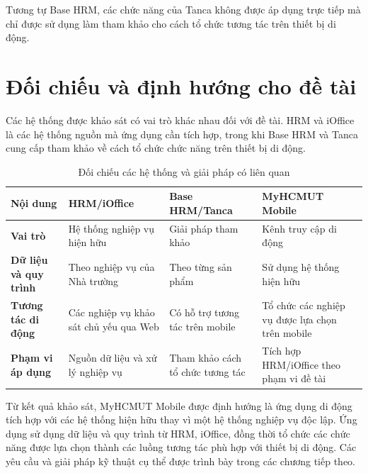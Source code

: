 Tương tự Base HRM, các chức năng của Tanca không được áp dụng trực tiếp mà chỉ được sử dụng làm tham khảo cho cách tổ chức tương tác trên thiết bị di động.

\section{Đối chiếu và định hướng cho đề tài}
\label{sec:tieuchi_doichieu}

Các hệ thống được khảo sát có vai trò khác nhau đối với đề tài. HRM và iOffice là các hệ thống nguồn mà ứng dụng cần tích hợp, trong khi Base HRM và Tanca cung cấp tham khảo về cách tổ chức chức năng trên thiết bị di động.

\begin{table}[H]
\centering
\small
\caption{Đối chiếu các hệ thống và giải pháp có liên quan}
\label{tab:compare_solutions}
\begin{tabularx}{\textwidth}{|>{\raggedright\arraybackslash\bfseries}p{2.8cm}|>{\raggedright\arraybackslash}X|>{\raggedright\arraybackslash}X|>{\raggedright\arraybackslash}X|}
\hline
\textbf{Nội dung} & \textbf{HRM/iOffice} & \textbf{Base HRM/Tanca} & \textbf{MyHCMUT Mobile} \\
\hline
Vai trò & Hệ thống nghiệp vụ hiện hữu & Giải pháp tham khảo & Kênh truy cập di động \\
\hline
Dữ liệu và quy trình & Theo nghiệp vụ của Nhà trường & Theo từng sản phẩm & Sử dụng hệ thống hiện hữu \\
\hline
Tương tác di động & Các nghiệp vụ khảo sát chủ yếu qua Web & Có hỗ trợ tương tác trên mobile & Tổ chức các nghiệp vụ được lựa chọn trên mobile \\
\hline
Phạm vi áp dụng & Nguồn dữ liệu và xử lý nghiệp vụ & Tham khảo cách tổ chức tương tác & Tích hợp HRM/iOffice theo phạm vi đề tài \\
\hline
\end{tabularx}
\end{table}

Từ kết quả khảo sát, MyHCMUT Mobile được định hướng là ứng dụng di động tích hợp với các hệ thống hiện hữu thay vì một hệ thống nghiệp vụ độc lập. Ứng dụng sử dụng dữ liệu và quy trình từ HRM, iOffice, đồng thời tổ chức các chức năng được lựa chọn thành các luồng tương tác phù hợp với thiết bị di động. Các yêu cầu và giải pháp kỹ thuật cụ thể được trình bày trong các chương tiếp theo.
